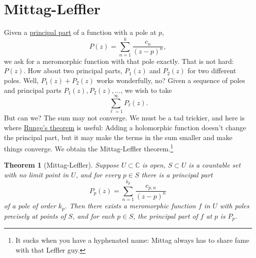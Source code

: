 \documentclass[12pt,openany]{book}
\newcommand{\C}{{\mathbb{C}}}
\theoremstyle{plain}
\newtheorem{thm}{Theorem}[section]
\theoremstyle{remark}
\theoremstyle{definition}
\theoremstyle{exercise}
\theoremstyle{example}
\begin{document}
\section{Mittag-Leffler}
\label{sec:mittaglefler}

Given a \hyperref[defn:principalpart]{principal part} of a function with a pole at $p$,
\begin{equation*}
P(z) = \sum_{n=1}^{k} \frac{c_n}{{(z-p)}^n} ,
\end{equation*}
we ask for a meromorphic function with that pole exactly.  That
is not hard: $P(z)$.  How about two principal parts, $P_1(z)$ and $P_2(z)$
for two different poles.  Well, $P_1(z)+P_2(z)$ works wonderfully, no?
Given a sequence of poles and principal parts
$P_1(z),P_2(z),\ldots$, we wish to take
\begin{equation*}
\sum_{\ell=1}^\infty P_\ell(z) .
\end{equation*}
But can we?  The sum may not converge.  We must be a tad
trickier, and here is where \hyperref[cor:rungeseq]{Runge's theorem} is useful:  Adding
a holomorphic function doesn't change the principal part, but it may make
the terms in the sum smaller and make things converge.
We obtain the
Mittag-Leffler theorem.\footnote{It sucks when you have a hyphenated name:
Mittag always has to share fame with that Leffler guy.}

\begin{thm}[Mittag-Leffler]
Suppose $U \subset \C$ is open, $S \subset U$ is a countable set with no
limit point in $U$, and for every $p \in S$ there is a principal part
\begin{equation*}
P_p(z) = \sum_{n=1}^{k_p} \frac{c_{p,n}}{{(z-p)}^n}
\end{equation*}
of a pole of order $k_p$.  Then there exists a meromorphic function $f$ in $U$
with poles precisely at points of $S$, and for each $p \in S$,
the principal part of $f$ at $p$ is $P_p$.
\end{thm}
\end{document}

